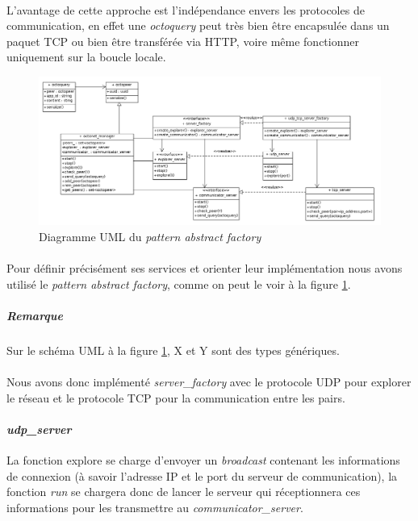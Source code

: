 \documentclass[a4paper]{article}
\begin{document}
			\paragraph{}{
			L’avantage de cette approche est l’indépendance envers les protocoles de communication, en effet
			une \textit{octoquery} peut très bien être encapsulée dans un paquet TCP ou bien être transférée via HTTP,
			voire même fonctionner uniquement sur la boucle locale.
			}
			\begin{figure}[!ht]
					\centering
					\includegraphics[scale=0.4]{UML/octonet_factory1.png}
					\caption{\label{factory_uml} Diagramme UML du \textit{pattern abstract factory}}
			\end{figure}
						
			
			\paragraph{}{
			Pour définir précisément ses services et orienter leur implémentation nous avons utilisé le
			\textit{pattern abstract factory}, comme on peut le voir à la figure \ref{factory_uml}.
			}
				\subparagraph{Remarque}{Sur le schéma UML à la figure \ref{factory_uml}, X et Y sont des types génériques.}
				
			\paragraph{}{
			Nous avons donc implémenté \textit{server\_factory} avec le protocole UDP pour explorer le réseau et le
			protocole TCP pour la communication entre les pairs.
			}
			\paragraph{\textit{udp\_server}}{
			La fonction explore se charge d’envoyer un \textit{broadcast} contenant les
			informations de connexion (à savoir l’adresse IP et le port du serveur de communication), la 
			fonction \textit{run} se chargera donc de lancer le serveur qui réceptionnera ces informations pour les
			transmettre au \textit{communicator\_server}.
			}
			
\end{document}
